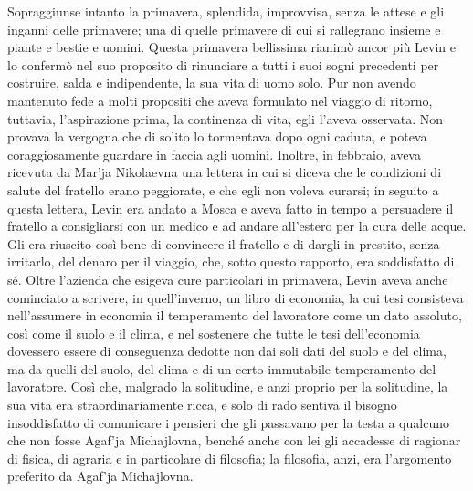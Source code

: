 Sopraggiunse intanto la primavera, splendida, improvvisa, senza le attese e gli inganni delle primavere; una di quelle primavere di cui si rallegrano insieme e piante e bestie e uomini. Questa primavera bellissima rianimò ancor più Levin e lo confermò nel suo proposito di rinunciare a tutti i suoi sogni precedenti per costruire, salda e indipendente, la sua vita di uomo solo. Pur non avendo mantenuto fede a molti propositi che aveva formulato nel viaggio di ritorno, tuttavia, l'aspirazione prima, la continenza di vita, egli l'aveva osservata. Non provava la vergogna che di solito lo tormentava dopo ogni caduta, e poteva coraggiosamente guardare in faccia agli uomini. Inoltre, in febbraio, aveva ricevuta da Mar'ja Nikolaevna una lettera in cui si diceva che le condizioni di salute del fratello erano peggiorate, e che egli non voleva curarsi; in seguito a questa lettera, Levin era andato a Mosca e aveva fatto in tempo a persuadere il fratello a consigliarsi con un medico e ad andare all'estero per la cura delle acque. Gli era riuscito così bene di convincere il fratello e di dargli in prestito, senza irritarlo, del denaro per il viaggio, che, sotto questo rapporto, era soddisfatto di sé. Oltre l'azienda che esigeva cure particolari in primavera, Levin aveva anche cominciato a scrivere, in quell'inverno, un libro di economia, la cui tesi consisteva nell'assumere in economia il temperamento del lavoratore come un dato assoluto, così come il suolo e il clima, e nel sostenere che tutte le tesi dell'economia dovessero essere di conseguenza dedotte non dai soli dati del suolo e del clima, ma da quelli del suolo, del clima e di un certo immutabile temperamento del lavoratore. Così che, malgrado la solitudine, e anzi proprio per la solitudine, la sua vita era straordinariamente ricca, e solo di rado sentiva il bisogno insoddisfatto di comunicare i pensieri che gli passavano per la testa a qualcuno che non fosse Agaf'ja Michajlovna, benché anche con lei gli accadesse di ragionar di fisica, di agraria e in particolare di filosofia; la filosofia, anzi, era l'argomento preferito da Agaf'ja Michajlovna. 

